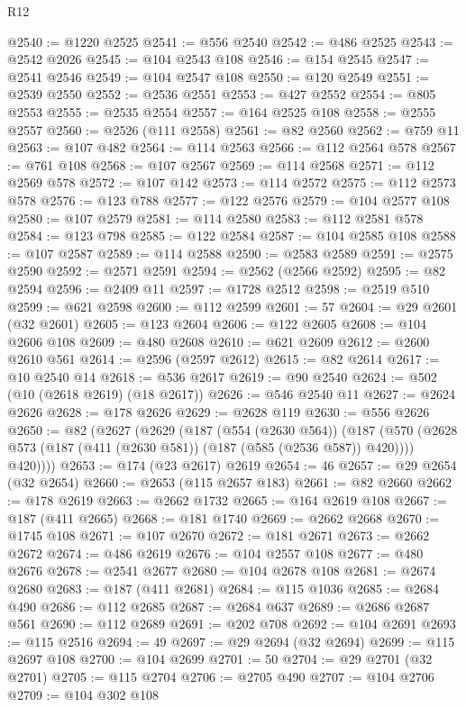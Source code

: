 \begin{lexlean}{R12}
\begin{coremodule}
@2540 := @1220 @2525
@2541 := @556 @2540
@2542 := @486 @2525
@2543 := @2542 @2026
@2545 := @104 @2543 @108
@2546 := @154 @2545
@2547 := @2541 @2546
@2549 := @104 @2547 @108
@2550 := @120 @2549
@2551 := @2539 @2550
@2552 := @2536 @2551
@2553 := @427 @2552
@2554 := @805 @2553
@2555 := @2535 @2554
@2557 := @164 @2525 @108
@2558 := @2555 @2557
@2560 := @2526 (@111 @2558)
@2561 := @82 @2560
@2562 := @759 @11
@2563 := @107 @482
@2564 := @114 @2563
@2566 := @112 @2564 @578
@2567 := @761 @108
@2568 := @107 @2567
@2569 := @114 @2568
@2571 := @112 @2569 @578
@2572 := @107 @142
@2573 := @114 @2572
@2575 := @112 @2573 @578
@2576 := @123 @788
@2577 := @122 @2576
@2579 := @104 @2577 @108
@2580 := @107 @2579
@2581 := @114 @2580
@2583 := @112 @2581 @578
@2584 := @123 @798
@2585 := @122 @2584
@2587 := @104 @2585 @108
@2588 := @107 @2587
@2589 := @114 @2588
@2590 := @2583 @2589
@2591 := @2575 @2590
@2592 := @2571 @2591
@2594 := @2562 (@2566 @2592)
@2595 := @82 @2594
@2596 := @2409 @11
@2597 := @1728 @2512
@2598 := @2519 @510
@2599 := @621 @2598
@2600 := @112 @2599
@2601 := 57
@2604 := @29 @2601 (@32 @2601)
@2605 := @123 @2604
@2606 := @122 @2605
@2608 := @104 @2606 @108
@2609 := @480 @2608
@2610 := @621 @2609
@2612 := @2600 @2610 @561
@2614 := @2596 (@2597 @2612)
@2615 := @82 @2614
@2617 := @10 @2540 @14
@2618 := @536 @2617
@2619 := @90 @2540
@2624 := @502 (@10 (@2618 @2619) (@18 @2617))
@2626 := @546 @2540 @11
@2627 := @2624 @2626
@2628 := @178 @2626
@2629 := @2628 @119
@2630 := @556 @2626
@2650 := @82
    (@2627
      (@2629
        (@187
          (@554 (@2630 @564))
          (@187
            (@570 (@2628 @573 (@187 (@411 (@2630 @581)) (@187 (@585 (@2536 @587)) @420))))
            @420))))
@2653 := @174 (@23 @2617) @2619
@2654 := 46
@2657 := @29 @2654 (@32 @2654)
@2660 := @2653 (@115 @2657 @183)
@2661 := @82 @2660
@2662 := @178 @2619
@2663 := @2662 @1732
@2665 := @164 @2619 @108
@2667 := @187 (@411 @2665)
@2668 := @181 @1740
@2669 := @2662 @2668
@2670 := @1745 @108
@2671 := @107 @2670
@2672 := @181 @2671
@2673 := @2662 @2672
@2674 := @486 @2619
@2676 := @104 @2557 @108
@2677 := @480 @2676
@2678 := @2541 @2677
@2680 := @104 @2678 @108
@2681 := @2674 @2680
@2683 := @187 (@411 @2681)
@2684 := @115 @1036
@2685 := @2684 @490
@2686 := @112 @2685
@2687 := @2684 @637
@2689 := @2686 @2687 @561
@2690 := @112 @2689
@2691 := @202 @708
@2692 := @104 @2691
@2693 := @115 @2516
@2694 := 49
@2697 := @29 @2694 (@32 @2694)
@2699 := @115 @2697 @108
@2700 := @104 @2699
@2701 := 50
@2704 := @29 @2701 (@32 @2701)
@2705 := @115 @2704
@2706 := @2705 @490
@2707 := @104 @2706
@2709 := @104 @302 @108

\end{coremodule}
\end{lexlean}
